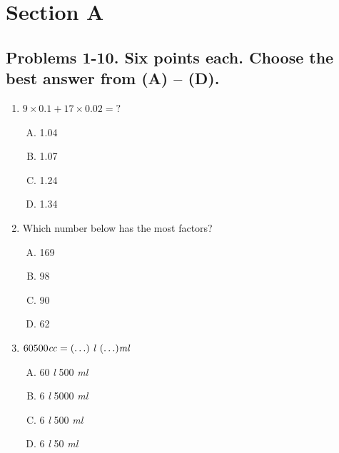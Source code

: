 \documentclass[12pt]{scrartcl}
\begin{document}
\pagestyle{plain}
\newpage
\section{Section A}
\subsection*{Problems 1-10. Six points each. Choose the best answer from (A) -- (D).}
\hrulefill

\begin{enumerate}
\item $9 \times 0.1 + 17 \times 0.02 = ?$
    \begin{multicols}{4}
        \begin{enumerate}[(A)]
            \item 1.04
            \item 1.07
            \item 1.24
            \item 1.34
        \end{enumerate}
    \end{multicols} \hrulefill

\item Which number below has the most factors?
    \begin{multicols}{4}
        \begin{enumerate}[(A)]
            \item 169
            \item 98
            \item 90
            \item 62
        \end{enumerate}
    \end{multicols} \hrulefill

\item $60500\text{\textit{cc}} = (\ldots)\text{ \textit{l} }(\ldots)\text{\textit{ml}}$
    \begin{multicols}{4}
        \begin{enumerate}[(A)]
            \item 60 \textit{l} 500 \textit{ml}
            \item 6 \textit{l} 5000 \textit{ml}
            \item 6 \textit{l} 500 \textit{ml}
            \item 6 \textit{l} 50 \textit{ml}
        \end{enumerate}
    \end{multicols} \hrulefill


\end{enumerate}
\end{document}
